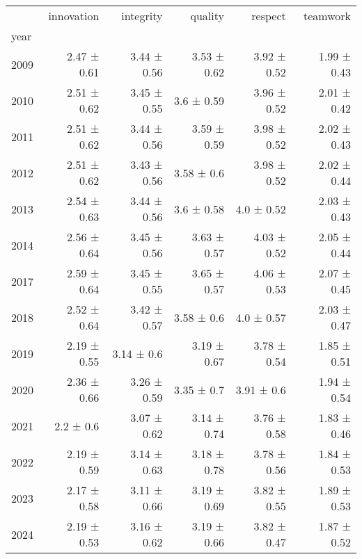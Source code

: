 \begin{tabular}{lrrrrr}
\toprule
 & innovation & integrity & quality & respect & teamwork \\
year &  &  &  &  &  \\
\midrule
2009 & 2.47 ± 0.61 & 3.44 ± 0.56 & 3.53 ± 0.62 & 3.92 ± 0.52 & 1.99 ± 0.43 \\
2010 & 2.51 ± 0.62 & 3.45 ± 0.55 & 3.6 ± 0.59 & 3.96 ± 0.52 & 2.01 ± 0.42 \\
2011 & 2.51 ± 0.62 & 3.44 ± 0.56 & 3.59 ± 0.59 & 3.98 ± 0.52 & 2.02 ± 0.43 \\
2012 & 2.51 ± 0.62 & 3.43 ± 0.56 & 3.58 ± 0.6 & 3.98 ± 0.52 & 2.02 ± 0.44 \\
2013 & 2.54 ± 0.63 & 3.44 ± 0.56 & 3.6 ± 0.58 & 4.0 ± 0.52 & 2.03 ± 0.43 \\
2014 & 2.56 ± 0.64 & 3.45 ± 0.56 & 3.63 ± 0.57 & 4.03 ± 0.52 & 2.05 ± 0.44 \\
2017 & 2.59 ± 0.64 & 3.45 ± 0.55 & 3.65 ± 0.57 & 4.06 ± 0.53 & 2.07 ± 0.45 \\
2018 & 2.52 ± 0.64 & 3.42 ± 0.57 & 3.58 ± 0.6 & 4.0 ± 0.57 & 2.03 ± 0.47 \\
2019 & 2.19 ± 0.55 & 3.14 ± 0.6 & 3.19 ± 0.67 & 3.78 ± 0.54 & 1.85 ± 0.51 \\
2020 & 2.36 ± 0.66 & 3.26 ± 0.59 & 3.35 ± 0.7 & 3.91 ± 0.6 & 1.94 ± 0.54 \\
2021 & 2.2 ± 0.6 & 3.07 ± 0.62 & 3.14 ± 0.74 & 3.76 ± 0.58 & 1.83 ± 0.46 \\
2022 & 2.19 ± 0.59 & 3.14 ± 0.63 & 3.18 ± 0.78 & 3.78 ± 0.56 & 1.84 ± 0.53 \\
2023 & 2.17 ± 0.58 & 3.11 ± 0.66 & 3.19 ± 0.69 & 3.82 ± 0.55 & 1.89 ± 0.53 \\
2024 & 2.19 ± 0.53 & 3.16 ± 0.62 & 3.19 ± 0.66 & 3.82 ± 0.47 & 1.87 ± 0.52 \\
\bottomrule
\end{tabular}
